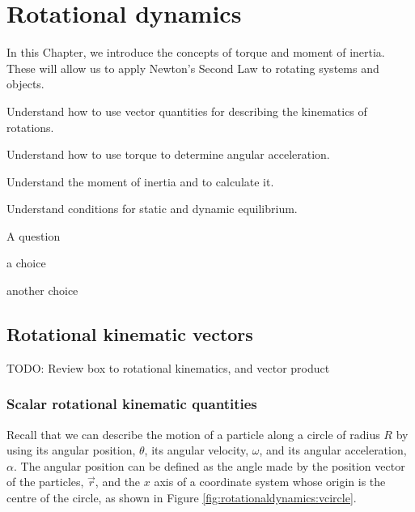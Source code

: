 
\chapter{Rotational dynamics}
\label{chapter:rotationaldynamics}
In this Chapter, we introduce the concepts of torque and moment of inertia. These will allow us to apply Newton's Second Law to rotating systems and objects. 

\begin{learningObjectives}{
 \item Understand how to use vector quantities for describing the kinematics of rotations.
 \item Understand how to use torque to determine angular acceleration.
 \item Understand the moment of inertia and to calculate it.
 \item Understand conditions for static and dynamic equilibrium.
 }
\end{learningObjectives}

\begin{opening}
\begin{MCquestion}{A question}
\item a choice
\item another choice %
\end{MCquestion}
\end{opening}

\section{Rotational kinematic vectors}
TODO: Review box to rotational kinematics, and vector product

\subsection{Scalar rotational kinematic quantities}
Recall that we can describe the motion of a particle along a circle of radius $R$ by using its angular position, $\theta$, its angular velocity, $\omega$, and its angular acceleration, $\alpha$. The angular position can be defined as the angle made by the position vector of the particles, $\vec r$, and the $x$ axis of a coordinate system whose origin is the centre of the circle, as shown in Figure \ref{fig:rotationaldynamics:vcircle}. 

